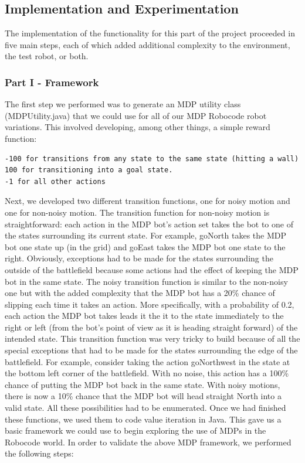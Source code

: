 \documentclass{aiaa-tc}%
\begin{document}
\subsection{Implementation and Experimentation}
The implementation of the functionality for this part of the project proceeded in five main steps, each of which added additional complexity to the environment, the test robot, or both. 
\subsubsection{Part I - Framework}
The first step we performed was to generate an MDP utility class (MDPUtility.java) that we could use for all of our MDP Robocode robot variations.
This involved developing, among other things, a simple reward function:
\begin{verbatim}
-100 for transitions from any state to the same state (hitting a wall)
100 for transitioning into a goal state.
-1 for all other actions	
\end{verbatim}
Next, we developed two different transition functions, one for noisy motion and one for non-noisy motion. The transition function for non-noisy motion is straightforward: each action in the MDP bot's action set takes the bot to one of the states surrounding its current state. For example, goNorth takes the MDP bot one state up (in the grid) and goEast takes the MDP bot one state to the right. Obviously, exceptions had to be made for the states surrounding the outside of the battlefield because some actions had the effect of keeping the MDP bot in the same state. The noisy transition function is similar to the non-noisy one but with the added complexity that the MDP bot has a 20\% chance of slipping each
time it takes an action. More specifically, with a probability of 0.2, each action the MDP bot takes leads it the it to the state immediately to the right or left (from the bot's point of view as it is heading straight forward) of the intended state. This transition function was very tricky to build because of all the special exceptions that had to be made for the states surrounding the edge of the battlefield. For example, consider taking the action goNorthwest in the state at the bottom left corner of the battlefield. With no noise, this action has a 100\% chance of putting the MDP bot back in the same state. With noisy motions, there is now a 10\% chance that the MDP bot will head straight North into a valid state. All these possibilities had to be enumerated. Once we had finished these functions, we used them to code value iteration in Java. This gave us a basic framework we could use to begin exploring the use of MDPs in the Robocode world. In order to validate the above MDP framework, we performed the following steps:
\end{document}
